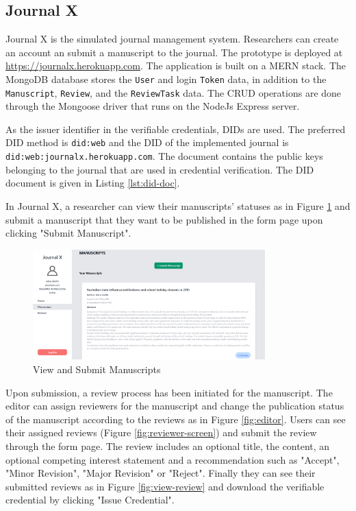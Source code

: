 \subsection{Journal X}

Journal X is the simulated journal management system. Researchers can create an account an submit a manuscript to the journal. The prototype is deployed at \url{https://journalx.herokuapp.com}. The application is built on a \acrshort{MERN} stack. The MongoDB database stores the \lstinline{User} and login \lstinline{Token} data, in addition to the \lstinline{Manuscript}, \lstinline{Review}, and the \lstinline{ReviewTask} data. The \acrshort{CRUD} operations are done through the Mongoose driver that runs on the NodeJs Express server.

As the issuer identifier in the verifiable credentials, \acrshort{DID}s are used. The preferred \acrshort{DID} method is \lstinline{did:web} and the \acrshort{DID} of the implemented journal is \lstinline{did:web:journalx.herokuapp.com}. The document contains the public keys belonging to the journal that are used in credential verification. The \acrshort{DID} document is given in Listing \ref{lst:did-doc}.



In Journal X, a researcher can view their manuscripts' statuses as in Figure  \ref{fig:submit-manuscript} and submit a manuscript that they want to be published in the form page upon clicking "Submit Manuscript". 

\begin{figure}[htpb]
  \centering
  \includegraphics[width=0.8\textwidth]{figures/submitManuscript.png}
  \caption{View and Submit Manuscripts} \label{fig:submit-manuscript}
\end{figure}

Upon submission, a review process has been initiated for the manuscript. The editor can assign reviewers for the manuscript and change the publication status of the manuscript according to the reviews as in Figure \ref{fig:editor}. Users can see their assigned reviews (Figure \ref{fig:reviewer-screen}) and submit the review through the form page. The review includes an optional title, the content, an optional competing interest statement and a recommendation such as "Accept", "Minor Revision", "Major Revision" or "Reject". Finally they can see their submitted reviews as in Figure \ref{fig:view-review} and download the verifiable credential by clicking "Issue Credential".

